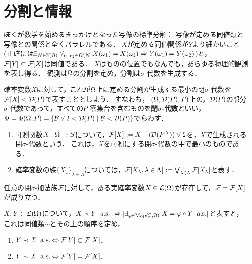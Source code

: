 \documentclass[uplatex,dvipdfmx]{jsreport}
\begin{document}
\section{分割と情報}

\begin{tcolorbox}[colframe=ForestGreen, colback=ForestGreen!10!white,breakable,colbacktitle=ForestGreen!40!white,coltitle=black,fonttitle=\bfseries\sffamily,
title=]
    ぼくが数学を始めるきっかけとなった写像の標準分解：
    写像が定める同値類と写像との関係と全くパラレルである．
    $X$が定める同値関係が$Y$より細かいこと(正確には$\exists_{N\in\mathbb{N}(\Omega)}\;\forall_{\epsilon_1,\epsilon_2\in\Omega\setminus N}\;X(\omega_1)=X(\omega_2)\Rightarrow Y(\omega_1)=Y(\omega_2)$)と，$\mathcal{F}[Y]\subset\mathcal{F}[X]$は同値である．
    $X$はものの位置でもなんでも，あらゆる物理的観測を表し得る．
    観測は$\Omega$の分割を定め，分割は$\sigma$-代数を生成する．
\end{tcolorbox}

\begin{notation}
    確率変数$X$に対して，これが$\Omega$上に定める分割が生成する最小の閉$\sigma$-代数を$\mathcal{F}[X]<\mathcal{D}(P)$で表すこととしよう．
    すなわち，
    $(\Omega,\mathcal{D}(P),P)$上の，$\mathcal{D}(P)$の部分$\sigma$-代数であって，すべての$P$-零集合を含むものを\textbf{閉$\sigma$-代数}といい，$\Phi=\Phi(\Omega,P)=\left\{\mathcal{B}\lor2<\mathcal{D}(P)\mid\mathcal{B}<\mathcal{D}(P)\right\}$でらわす．
\end{notation}

\begin{definition}\mbox{}
    \begin{enumerate}
        \item 可測関数$X:\Omega\to S$について，$\mathcal{F}[X]:=X^{-1}(\mathcal{D}(P^X))\lor 2$を，$X$で生成される閉$\sigma$-代数という．
        これは，$X$を可測にする閉$\sigma$-代数の中で最小のものである．
        \item 確率変数の族$\{X_\lambda\}_{\lambda\in\Lambda}$については，$\mathcal{F}[X_\lambda,\lambda\in\Lambda]:=\bigvee_{\lambda\in\Lambda}\mathcal{F}[X_\lambda]$と表す．
    \end{enumerate}
\end{definition}

\begin{theorem}
    任意の閉$\sigma$-加法族$\mathcal{F}$に対して，ある実確率変数$X\in\mathcal{L}(\Omega)$が存在して，$\mathcal{F}=\mathcal{F}[X]$が成り立つ．
\end{theorem}

\begin{theorem}
    $X,Y\in\mathcal{L}(\Omega)$について，$X\prec Y\;\;\mathrm{a.s.}:\Leftrightarrow [\exists_{\varphi\in\mathrm{Map}(\Omega,\Omega)}\;X=\varphi\circ Y\;\;\mathrm{a.s.}]$と表すと，これは同値類$\sim$とその上の順序を定め，
    \begin{enumerate}
        \item $Y\prec X\;\;\mathrm{a.s.}\Leftrightarrow\mathcal{F}[Y]\subset\mathcal{F}[X]$．
        \item $Y\sim X\;\;\mathrm{a.s.}\Leftrightarrow\mathcal{F}[Y]=\mathcal{F}[X]$．
    \end{enumerate}
\end{theorem}
\end{document}
